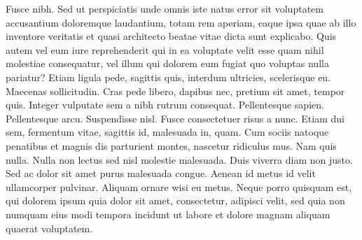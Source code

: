 \documentclass[czech,master,dept460,male,cpp,cpdeclaration]{diploma}
\begin{document}
Fusce nibh. Sed ut perspiciatis unde omnis iste natus error sit voluptatem accusantium doloremque laudantium, totam rem aperiam, eaque ipsa quae ab illo inventore veritatis et quasi architecto beatae vitae dicta sunt explicabo. Quis autem vel eum iure reprehenderit qui in ea voluptate velit esse quam nihil molestiae consequatur, vel illum qui dolorem eum fugiat quo voluptas nulla pariatur? Etiam ligula pede, sagittis quis, interdum ultricies, scelerisque eu. Maecenas sollicitudin. Cras pede libero, dapibus nec, pretium sit amet, tempor quis. Integer vulputate sem a nibh rutrum consequat. Pellentesque sapien. Pellentesque arcu. Suspendisse nisl. Fusce consectetuer risus a nunc. Etiam dui sem, fermentum vitae, sagittis id, malesuada in, quam. Cum sociis natoque penatibus et magnis dis parturient montes, nascetur ridiculus mus. Nam quis nulla. Nulla non lectus sed nisl molestie malesuada. Duis viverra diam non justo. Sed ac dolor sit amet purus malesuada congue. Aenean id metus id velit ullamcorper pulvinar. Aliquam ornare wisi eu metus. Neque porro quisquam est, qui dolorem ipsum quia dolor sit amet, consectetur, adipisci velit, sed quia non numquam eius modi tempora incidunt ut labore et dolore magnam aliquam quaerat voluptatem.

\printbibliography[title={Literatura}, heading=bibintoc]
\end{document}
